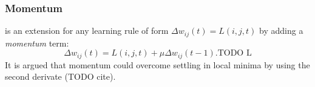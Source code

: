 \subsubsection{Momentum}
\label{sec:our-momentum}

\citep{rumelhart1986learning, yu1997efficient} is an extension for any learning rule of form $\Delta w_{ij}(t) = L(i,j,t)$ by adding a \emph{momentum} term: 
\begin{equation} 
  \Delta w_{ij}(t) = L(i,j,t) + \mu \Delta w_{ij}(t-1). \mbox{TODO L}
\end{equation} 
It is argued that momentum could overcome settling in local minima by using the second derivate (TODO cite). 
